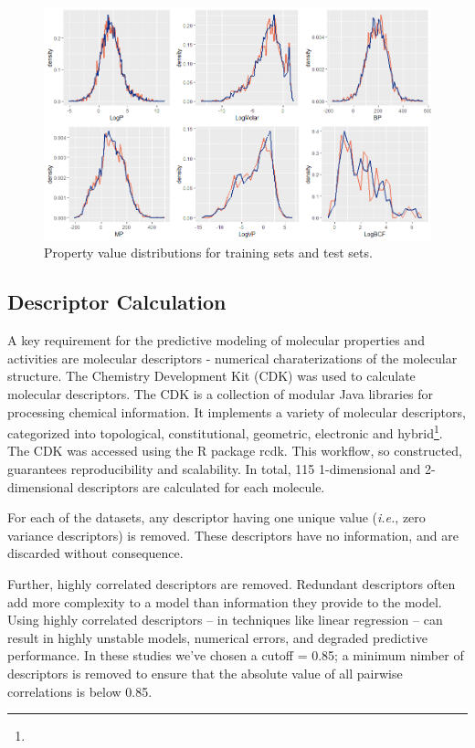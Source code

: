 \documentclass[10pt, letter]{article}
\renewcommand{\=}{\, =\, }
\newcommand{\+}{\, +\, }
\renewcommand{\-}{\, -\, }
\begin{document}
\begin{figure}
  \caption{Property value distributions for training sets and test sets.}
  \centering
    \includegraphics[width=1.0\textwidth]{TrainTestDensity.png}
\end{figure}

\subsection{Descriptor Calculation}

A key requirement for the predictive modeling of molecular properties and activities are molecular descriptors - numerical charaterizations of the molecular structure. The Chemistry Development Kit (CDK)\cite{CDK} was used to calculate molecular descriptors. The CDK is a collection of modular Java libraries for processing chemical information. It  implements a variety of molecular descriptors, categorized into topological, constitutional, geometric, electronic and hybrid\footnote{}. The CDK was accessed using the R\cite{R} package rcdk\cite{rcdk}. This workflow, so constructed, guarantees reproducibility and scalability. In total, 115 1-dimensional and 2-dimensional descriptors are calculated for each molecule.

For each of the datasets, any descriptor having one unique value (\textit{i.e.}, zero variance descriptors) is removed. These descriptors have no information, and are discarded without consequence.

Further, highly correlated descriptors are removed. Redundant descriptors often add more complexity to a model than information they provide to the model. Using highly correlated descriptors -- in techniques like linear regression -- can result in highly unstable models, numerical errors, and degraded predictive performance. In these studies we've chosen a cutoff = 0.85; a minimum nimber of descriptors is removed to ensure that the absolute value of all pairwise correlations is below 0.85.
\end{document}
